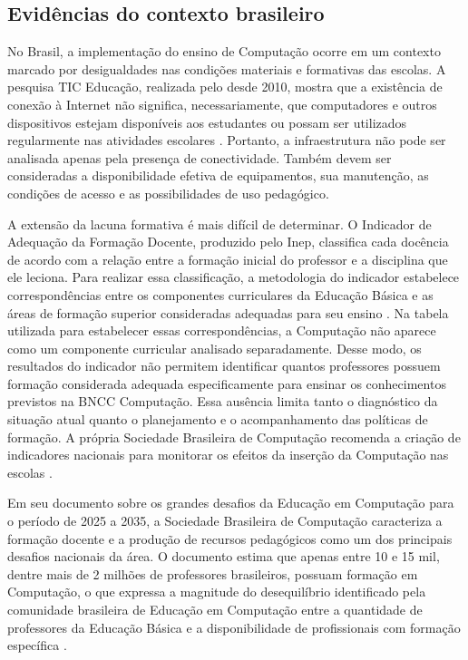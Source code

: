 \subsection{Evidências do contexto brasileiro}
\label{subsec:evidencias-contexto-brasileiro}

No Brasil, a implementação do ensino de Computação ocorre em um contexto marcado por desigualdades nas condições materiais e formativas das escolas. A pesquisa TIC Educação, realizada pelo  desde 2010, mostra que a existência de conexão à Internet não significa, necessariamente, que computadores e outros dispositivos estejam disponíveis aos estudantes ou possam ser utilizados regularmente nas atividades escolares \cite{cetic2024tic2023}. Portanto, a infraestrutura não pode ser analisada apenas pela presença de conectividade. Também devem ser consideradas a disponibilidade efetiva de equipamentos, sua manutenção, as condições de acesso e as possibilidades de uso pedagógico.

A extensão da lacuna formativa é mais difícil de determinar. O Indicador de Adequação da Formação Docente, produzido pelo Inep, classifica cada docência de acordo com a relação entre a formação inicial do professor e a disciplina que ele leciona. Para realizar essa classificação, a metodologia do indicador estabelece correspondências entre os componentes curriculares da Educação Básica e as áreas de formação superior consideradas adequadas para seu ensino \cite{inep2014adequacaoformacaodocente,inep2021atualizacaoadequacao}. Na tabela utilizada para estabelecer essas correspondências, a Computação não aparece como um componente curricular analisado separadamente. Desse modo, os resultados do indicador não permitem identificar quantos professores possuem formação considerada adequada especificamente para ensinar os conhecimentos previstos na BNCC Computação. Essa ausência limita tanto o diagnóstico da situação atual quanto o planejamento e o acompanhamento das políticas de formação. A própria Sociedade Brasileira de Computação recomenda a criação de indicadores nacionais para monitorar os efeitos da inserção da Computação nas escolas \cite{sbc2025grandesdesafios}.

Em seu documento sobre os grandes desafios da Educação em Computação para o período de 2025 a 2035, a Sociedade Brasileira de Computação caracteriza a formação docente e a produção de recursos pedagógicos como um dos principais desafios nacionais da área. O documento estima que apenas entre 10 e 15 mil, dentre mais de 2 milhões de professores brasileiros, possuam formação em Computação, o que expressa a magnitude do desequilíbrio identificado pela comunidade brasileira de Educação em Computação entre a quantidade de professores da Educação Básica e a disponibilidade de profissionais com formação específica \cite{sbc2025grandesdesafios}.


